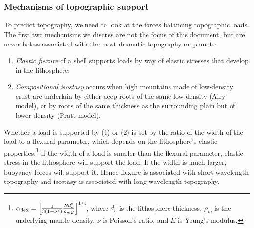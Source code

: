 \subsubsection{Mechanisms of topographic support}\label{sec:top_mechs}


To predict topography, we need to look at the forces balancing topographic loads. The first two mechanisms we discuss are not the focus of this document, but are nevertheless associated with the most dramatic topography on planets:
\begin{enumerate}
\item \emph{Elastic flexure} of a shell supports loads by way of elastic stresses that develop in the lithosphere;
\item \emph{Compositional isostasy} occurs when high mountains made of low-density crust are underlain by either deep roots of the same low density (Airy model), or by roots of the same thickness as the surrounding plain but of lower density (Pratt model).
\end{enumerate}
Whether a load is supported by (1) or (2) is set by the ratio of the width of the load to a flexural parameter, which depends on the lithosphere's elastic properties.\footnote{$\alpha_{\rm flex} = \left[\frac{1}{3(1 - \nu^2)}\frac{Ed_e^3}{\rho_m g}\right]^{1/4}$, where $d_e$ is the lithosphere thickness, $\rho_m$ is the underlying mantle density, $\nu$ is Poisson's ratio, and $E$ is Young's modulus.}
If the width of a load is smaller than the flexural parameter, elastic stress in the lithosphere will support the load. If the width is much larger, buoyancy forces will support it. Hence flexure is associated with short-wavelength topography and isostasy is associated with long-wavelength topography. 

